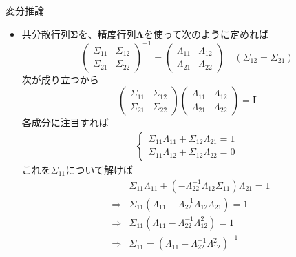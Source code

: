 \documentclass[dvipdfmx,notheorems,t]{beamer}
\begin{document}
\begin{frame}{変分推論}
\begin{itemize}
\begin{itemize}
		\item 共分散行列$\bm{\Sigma}$を、精度行列$\bm{\Lambda}$を使って次のように定めれば
		\begin{equation}
			\left( \begin{array}{ll} \Sigma_{11} & \Sigma_{12} \\ \Sigma_{21} & \Sigma_{22} \end{array} \right)^{-1} = \left( \begin{array}{ll} \Lambda_{11} & \Lambda_{12} \\ \Lambda_{21} & \Lambda_{22} \end{array} \right) \quad (\Sigma_{12} = \Sigma_{21})
		\end{equation}
		次が成り立つから
		\begin{equation}
			 \left( \begin{array}{ll} \Sigma_{11} & \Sigma_{12} \\ \Sigma_{21} & \Sigma_{22} \end{array} \right) \left( \begin{array}{ll} \Lambda_{11} & \Lambda_{12} \\ \Lambda_{21} & \Lambda_{22} \end{array} \right) = \bm{I}
		\end{equation}
		各成分に注目すれば
		\begin{eqnarray}
			\left\{ \begin{array}{l} \Sigma_{11} \Lambda_{11} + \Sigma_{12} \Lambda_{21} = 1 \\
			\Sigma_{11} \Lambda_{12} + \Sigma_{12} \Lambda_{22} = 0 \end{array} \right.
		\end{eqnarray}
		これを$\Sigma_{11}$について解けば
		\begin{eqnarray}
			&& \Sigma_{11} \Lambda_{11} + \left( -\Lambda_{22}^{-1} \Lambda_{12} \Sigma_{11} \right) \Lambda_{21} = 1 \\
			&\Rightarrow& \Sigma_{11} \left( \Lambda_{11} - \Lambda_{22}^{-1} \Lambda_{12} \Lambda_{21} \right) = 1 \\
			&\Rightarrow& \Sigma_{11} \left( \Lambda_{11} - \Lambda_{22}^{-1} \Lambda_{12}^2 \right) = 1 \\
			&\Rightarrow& \Sigma_{11} = \left( \Lambda_{11} - \Lambda_{22}^{-1} \Lambda_{12}^2 \right)^{-1}
		\end{eqnarray}
		

\end{itemize}
\end{itemize}
\end{frame}
\end{document}
